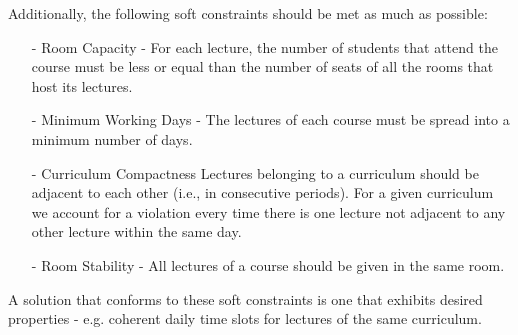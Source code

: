 Additionally, the following soft constraints should be met as much as possible:
\begin{itemize}
\item[-] Room Capacity - For each lecture, the number of students that attend the course must be less or equal than the number of seats of all the rooms that host its lectures. 
\item[-] Minimum Working Days - The lectures of each course must be spread into a minimum number of days. 
\item[-] Curriculum Compactness Lectures belonging to a curriculum should be adjacent to each other (i.e., in consecutive periods). For a given curriculum we account for a violation every time there is one lecture not adjacent to any other lecture within the same day. 
\item[-] Room Stability - All lectures of a course should be given in the same room. 
\end{itemize}
A solution that conforms to these soft constraints is one that exhibits desired properties - e.g. coherent daily time slots for lectures of the same curriculum.
